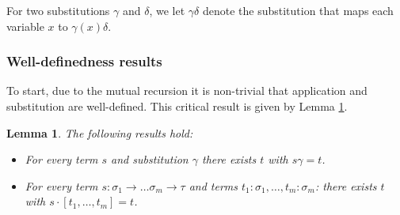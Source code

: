 \documentclass{lmcs}
\theoremstyle{theorem}\newtheorem{theorem}{Theorem}
\theoremstyle{theorem}\newtheorem{lemma}[theorem]{Lemma}
\theoremstyle{theorem}\newtheorem{corollary}[theorem]{Corollary}
\theoremstyle{definition}\newtheorem{definition}[theorem]{Definition}
\theoremstyle{definition}\newtheorem{example}[theorem]{Example}
\newcommand{\atype}{\sigma}
\newcommand{\btype}{\tau}
\newcommand{\arrtype}{\rightarrow}
\newcommand{\mysubsection}[1]{\vspace{-12pt}\subsubsection{#1}}
\begin{document}
For two substitutions $\gamma$ and $\delta$, we let $\gamma\delta$ denote the substitution that
maps each variable $x$ to $\gamma(x)\delta$.

\mysubsection{Well-definedness results}
To start, due to the mutual recursion it is non-trivial that application and substitution are
well-defined.  This critical result is given by Lemma \ref{lem:substdefined}.

\begin{lemma}\label{lem:substdefined}
The following results hold:
\begin{itemize}
\item For every term $s$ and substitution $\gamma$ there exists $t$ with $s\gamma = t$.
\item For every term $s : \atype_1 \arrtype \dots \atype_m \arrtype \btype$ and terms
  $t_1 : \atype_1,\dots,t_m : \atype_m$: there exists $t$ with $s \cdot [t_1,\dots,t_m] = t$.
\end{itemize}
\end{lemma}
\end{document}
